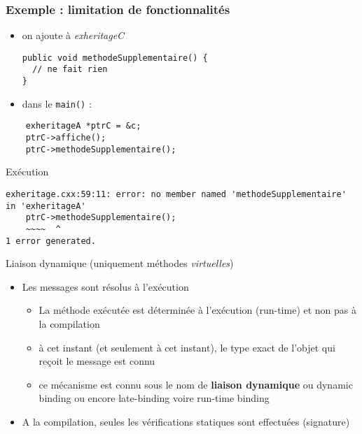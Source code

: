 \begin{frame}
\frametitle{Exemple : limitation de fonctionnalités}
\begin{itemize}
\item on ajoute à \emph{exheritageC}
\begin{lstlisting}
public void methodeSupplementaire() {
  // ne fait rien
}
\end{lstlisting}
\item dans le \texttt{main()} :
\end{itemize}
\begin{lstlisting}
    exheritageA *ptrC = &c;
    ptrC->affiche();
    ptrC->methodeSupplementaire();
\end{lstlisting}
\begin{block}{Exécution}
{\tiny \begin{verbatim}
exheritage.cxx:59:11: error: no member named 'methodeSupplementaire' in 'exheritageA'
    ptrC->methodeSupplementaire();
    ~~~~  ^
1 error generated.
\end{verbatim}}
\end{block}
\end{frame}

\begin{frame}{Liaison dynamique (uniquement méthodes \textit{virtuelles})}
\begin{itemize}
	\item Les messages sont résolus à l'exécution
	\begin{itemize}
		\item La méthode exécutée est déterminée à l'exécution (run-time) et non pas à la compilation
		\item à cet instant (et seulement à cet instant), le type exact de l'objet qui reçoit le message est connu
		\item ce mécanisme est connu sous le nom de \textbf{liaison dynamique} ou dynamic binding ou encore late-binding voire run-time binding
	\end{itemize}
	\item A la compilation, seules les vérifications statiques sont effectuées (signature)
\end{itemize}
\end{frame}

